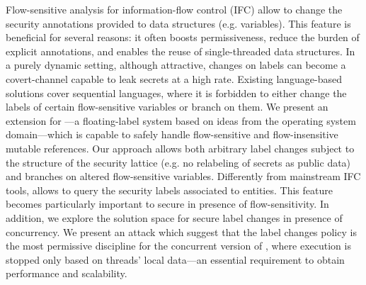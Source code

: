 Flow-sensitive analysis for information-flow control (IFC) allow to change the
security annotations provided to data structures (e.g. variables). This feature
is beneficial for several reasons: it often boosts permissiveness, reduce the
burden of explicit annotations, and enables the reuse of single-threaded data
structures. In a purely dynamic setting, although attractive, changes on labels
can become a covert-channel capable to leak secrets at a high rate. Existing
language-based solutions cover sequential languages, where it is forbidden to
either change the labels of certain flow-sensitive variables or branch on them.
We present an extension for {\LIO}---a floating-label system based on ideas from
the operating system domain---which is capable to safely handle flow-sensitive
and flow-insensitive mutable references. Our approach allows both arbitrary
label changes subject to the structure of the security lattice (e.g. no
relabeling of secrets as public data) and branches on altered flow-sensitive
variables.  Differently from mainstream IFC tools, {\LIO} allows to query the
security labels associated to entities. This feature becomes particularly
important to secure in presence of flow-sensitivity. In addition, we explore the
solution space for secure label changes in presence of concurrency. We present
an attack which suggest that the label changes policy \emph{{\nsu}} is the most
permissive discipline for the concurrent version of {\LIO}, where execution is
stopped only based on threads’ local data---an essential requirement to obtain
performance and scalability.







  




 


